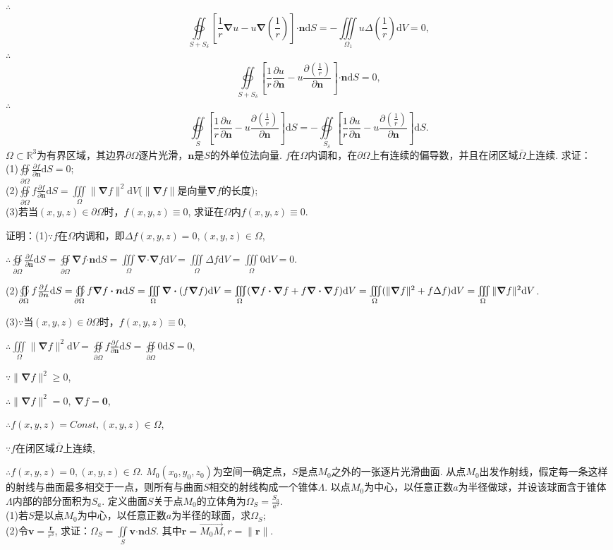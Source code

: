 \documentclass[12pt,UTF8]{ctexart}
\newcommand{\IInt}[3]{\iint\limits_{#1}#2\mathrm d#3}
\newcommand{\IIInt}[3]{\iiint\limits_{#1}#2\mathrm d#3}
\newcommand{\md}[1]{\mathrm d#1}
\newcommand{\pp}[2]{\frac{\partial #1}{\partial #2}}
\newcommand{\BSOIInt}[2]{\oiint\limits_{#1}#2}
\begin{document}
\begin{enumerate}
$\therefore$
\[\BSOIInt{S+S_\delta}{[\frac1r\bm\nabla u-u\bm\nabla(\frac1r)]\bm\cdot\bm n\md S}=-\IIInt{\Omega_1}{u\Delta(\frac1r)}V=0,\]
$\therefore$
\[\BSOIInt{S+S_\delta}{[\frac1r\pp u{\bm n}-u\pp{(\frac1r)}{\bm n}]\bm\cdot\bm n\md S}=0,\]
$\therefore$
\[\BSOIInt S{[\frac1r\pp u{\bm n}-u\pp{(\frac1r)}{\bm n}]\md S}=-\BSOIInt{S_\delta}{[\frac1r\pp u{\bm n}-u\pp{(\frac1r)}{\bm n}]\md S}.\]
$\Omega\subset\mathbb R^3$为有界区域，其边界$\partial\Omega$逐片光滑，$\bm n$是$S$的外单位法向量. $f$在$\Omega$内调和，在$\partial\Omega$上有连续的偏导数，并且在闭区域$\bar\Omega$上连续. 求证：\\
(1)$\BSOIInt{\partial\Omega}\pp f{\bm n}\md S=0$;\\
(2)$\BSOIInt{\partial\Omega}f\pp f{\bm n}\md S=\IIInt\Omega{\|\bm\nabla f\|^2}V$($\|\bm\nabla f\|$是向量$\bm\nabla f$的长度);\\
(3)若当$(x,y,z)\in\partial\Omega$时，$f(x,y,z)\equiv0$, 求证在$\Omega$内$f(x,y,z)\equiv0$.

证明：(1)$\because f$在$\Omega$内调和，即$\Delta f(x,y,z)=0,(x,y,z)\in\Omega$,

$\therefore\BSOIInt{\partial\Omega}\pp f{\bm n}\md S=\BSOIInt{\partial\Omega}{\bm\nabla f\bm\cdot\bm n\md S}=\IIInt\Omega{\bm\nabla\bm\cdot\bm\nabla f}V=\IIInt\Omega{\Delta f}V=\IIInt\Omega0V=0$.

(2)$\BSOIInt{\partial\Omega}f\pp f{\bm n}\md S=\BSOIInt{\partial\Omega}{f\bm\nabla f\bm\cdot\bm n\md S}=\IIInt\Omega{\bm\nabla\bm\cdot(f\bm\nabla f)}V=\IIInt\Omega{(\bm\nabla f\bm\cdot\bm\nabla f+f\bm\nabla\bm\cdot\bm\nabla f)}V\\
=\IIInt\Omega{(\|\bm\nabla f\|^2+f\Delta f)}V=\IIInt\Omega{\|\bm\nabla f\|^2}V$.

(3)$\because$当$(x,y,z)\in\partial\Omega$时，$f(x,y,z)\equiv0$,

$\therefore\IIInt\Omega{\|\bm\nabla f\|^2}V=\BSOIInt{\partial\Omega}f\pp f{\bm n}\md S=\BSOIInt{\partial\Omega}0\md S=0$,

$\because\|\bm\nabla f\|^2\geqslant0$,

$\therefore\|\bm\nabla f\|^2=0,\ \bm\nabla f=\bm0$,

$\therefore f(x,y,z)=Const,(x,y,z)\in\Omega$,

$\because f$在闭区域$\bar\Omega$上连续,

$\therefore f(x,y,z)=0,(x,y,z)\in\Omega$.
$M_0(x_0,y_0,z_0)$为空间一确定点，$S$是点$M_0$之外的一张逐片光滑曲面. 从点$M_0$出发作射线，假定每一条这样的射线与曲面最多相交于一点，则所有与曲面$S$相交的射线构成一个锥体$\Lambda$. 以点$M_0$为中心，以任意正数$a$为半径做球，并设该球面含于锥体$\Lambda$内部的部分面积为$S_a$. 定义曲面$S$关于点$M_0$的立体角为$\Omega_S=\frac{S_a}{a^2}$.\\
(1)若$S$是以点$M_0$为中心，以任意正数$a$为半径的球面，求$\Omega_S$;\\
(2)令$\bm v=\frac{\bm r}{r^3}$, 求证：$\Omega_S=\IInt S{\bm v\bm\cdot\bm n}S$. 其中$\bm r=\overrightarrow{M_0M},r=\|\bm r\|$.


\end{enumerate}
\end{document}
